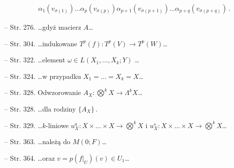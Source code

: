 \documentclass[a4paper,11pt]{article}
\begin{document}
\begin{itemize}
\begin{displaymath}
\begin{split}
      & \quad \qquad \alpha_{ 1 } ( v_{ \sigma( 1 ) } ) \ldots \alpha_{ p } ( v_{ \sigma ( p ) } ) \alpha_{ p
        + 1 } ( v_{ \sigma( p + 1 ) } ) \ldots \alpha_{ p + q } ( v_{ \sigma ( p + q ) } )
      \, .
    \end{split}
  \end{displaymath}
\item[--] Str. 276. \ldots gdyż macierz $A$\ldots
\item[--] Str. 304. \ldots indukowane
  $T^{ p } ( f ) : T^{ p } ( V ) \rightarrow T^{ p } (W)$\ldots
\item[--] Str. 322. \ldots element $\omega \in L( X_{ 1 } ,\ldots, X_{ k }; Y )$ \ldots
\item[--] Str. 324. \ldots w przypadku $X_{ 1 } = \ldots = X_{ k } = X$\ldots
\item[--] Str. 328. Odwzorowanie
  $A_{ X } : \bigotimes^{ k } X \rightarrow \Lambda^{ k } X$\ldots
\item[--] Str. 328. \ldots dla rodziny $\{ A_{ X } \} \, .$
\item[--] Str. 329. \ldots $k$-liniowe
  $u^{ a }_{ X } : X \times \ldots \times X \rightarrow \bigotimes^{ k } X$ i
  $u^{ s }_{ X } : X \times \ldots \times X \rightarrow \bigotimes^{ k } X$\ldots
\item[--] Str. 363. \ldots należą do $M( 0; F )$\ldots
\item[--] Str. 364. \ldots oraz $v = p( f |_{ U } ) ( v ) \in U_{ 1 }$\ldots
\end{itemize}












\end{document}
